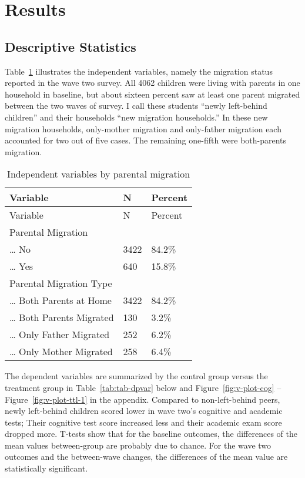 \documentclass[
  man,floatsintext]{apa7}
\begin{document}
\newpage

\hypertarget{results}{%
\section{Results}\label{results}}

\hypertarget{descriptive-statistics}{%
\subsection{Descriptive Statistics}\label{descriptive-statistics}}

Table~\ref{tab:tab-idpvar} illustrates the independent variables, namely the migration status reported in the wave two survey. All 4062 children were living with parents in one household in baseline, but about sixteen percent saw at least one parent migrated between the two waves of survey. I call these students ``newly left-behind children'' and their households ``new migration households.'' In these new migration households, only-mother migration and only-father migration each accounted for two out of five cases. The remaining one-fifth were both-parents migration.

\renewcommand{\arraystretch}{0.72}

\begin{longtable}[]{@{}lll@{}}
\caption{\label{tab:tab-idpvar}Independent variables by parental migration}\tabularnewline
\toprule()
Variable & N & Percent \\
\midrule()
\endfirsthead
\toprule()
Variable & N & Percent \\
\midrule()
\endhead
Parental Migration & & \\
\ldots{} No & 3422 & 84.2\% \\
\ldots{} Yes & 640 & 15.8\% \\
Parental Migration Type & & \\
\ldots{} Both Parents at Home & 3422 & 84.2\% \\
\ldots{} Both Parents Migrated & 130 & 3.2\% \\
\ldots{} Only Father Migrated & 252 & 6.2\% \\
\ldots{} Only Mother Migrated & 258 & 6.4\% \\
\bottomrule()
\end{longtable}

\newpage

The dependent variables are summarized by the control group versus the treatment group in Table~\ref{tab:tab-dpvar} below and Figure~\ref{fig:v-plot-cog} -- Figure~\ref{fig:v-plot-ttl-1} in the appendix. Compared to non-left-behind peers, newly left-behind children scored lower in wave two's cognitive and academic tests; Their cognitive test score increased less and their academic exam score dropped more. T-tests show that for the baseline outcomes, the differences of the mean values between-group are probably due to chance. For the wave two outcomes and the between-wave changes, the differences of the mean value are statistically significant.
\end{document}
